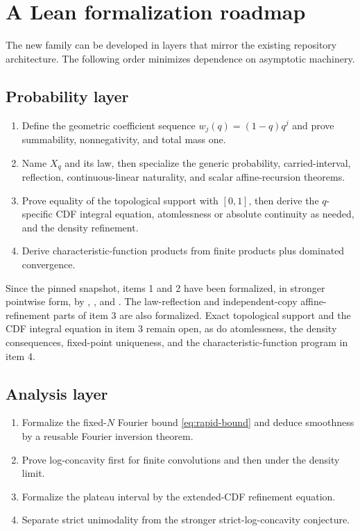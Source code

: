 \documentclass[11pt,oneside]{article}
\theoremstyle{definition}
\theoremstyle{remark}
\begin{document}
\section{A Lean formalization roadmap}
\label{sec:lean}

The new family can be developed in layers that mirror the existing repository architecture.
The following order minimizes dependence on asymptotic machinery.

\subsection{Probability layer}

\begin{enumerate}
\item Define the geometric coefficient sequence $w_j(q)= (1-q)q^j$ and prove summability,
      nonnegativity, and total mass one.
\item Name \(X_q\) and its law, then specialize the generic probability, carried-interval,
      reflection, continuous-linear naturality, and scalar affine-recursion theorems.
\item Prove equality of the topological support with \([0,1]\), then derive the
      \(q\)-specific CDF integral equation, atomlessness or absolute continuity as needed,
      and the density refinement.
\item Derive characteristic-function products from finite products plus dominated convergence.
\end{enumerate}

Since the pinned snapshot, items 1 and 2 have been formalized, in stronger pointwise form,
by , , and
.  The law-reflection and independent-copy affine-refinement
parts of item 3 are also formalized.  Exact topological support and the CDF integral equation
in item 3 remain open, as do atomlessness, the density consequences, fixed-point uniqueness,
and the characteristic-function program in item 4.

\subsection{Analysis layer}

\begin{enumerate}
\item Formalize the fixed-$N$ Fourier bound \eqref{eq:rapid-bound} and deduce smoothness by a
      reusable Fourier inversion theorem.
\item Prove log-concavity first for finite convolutions and then under the density limit.
\item Formalize the plateau interval by the extended-CDF refinement equation.
\item Separate strict unimodality from the stronger strict-log-concavity conjecture.
\end{enumerate}
\end{document}
